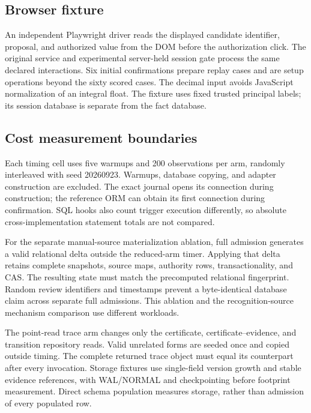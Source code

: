 \subsection{Browser fixture}

An independent Playwright driver reads the displayed candidate identifier, proposal, and authorized value from the DOM before the authorization click. The original  service and experimental server-held session gate process the same declared interactions. Six initial confirmations prepare replay cases and are setup operations beyond the sixty scored cases. The decimal input avoids JavaScript normalization of an integral float. The fixture uses fixed trusted principal labels; its session database is separate from the fact database.

\subsection{Cost measurement boundaries}

Each timing cell uses five warmups and 200 observations per arm, randomly interleaved with seed 20260923. Warmups, database copying, and adapter construction are excluded. The exact journal opens its connection during construction; the reference ORM can obtain its first connection during confirmation. SQL hooks also count trigger execution differently, so absolute cross-implementation statement totals are not compared.

For the separate manual-source materialization ablation, full admission generates a valid relational delta outside the reduced-arm timer. Applying that delta retains complete snapshots, source maps, authority rows, transactionality, and CAS. The resulting state must match the precomputed relational fingerprint. Random review identifiers and timestamps prevent a byte-identical database claim across separate full admissions. This ablation and the recognition-source mechanism comparison use different workloads.

The point-read trace arm changes only the certificate, certificate--evidence, and transition repository reads. Valid unrelated forms are seeded once and copied outside timing. The complete returned trace object must equal its counterpart after every invocation. Storage fixtures use single-field version growth and stable evidence references, with WAL/NORMAL and checkpointing before footprint measurement. Direct schema population measures storage, rather than admission of every populated row.

